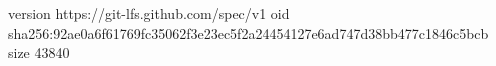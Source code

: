 version https://git-lfs.github.com/spec/v1
oid sha256:92ae0a6f61769fc35062f3e23ec5f2a24454127e6ad747d38bb477c1846c5bcb
size 43840
